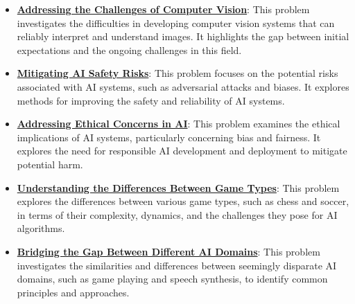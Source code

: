 \documentclass{article}%
\begin{document}
\begin{itemize}[leftmargin=*]
\item \href{https://purdue.brightspace.com/d2l/common/assets/pdfjs-d2l-dist/1.0.14-legacy/web/viewer.html?file=%2Fcontent%2Fenforced%2F1095467-wl.202510.CS.24300.001%2F02L2-Intro.pdf%3Fou%3D1095467&lang=en-us&container=d2l-fileviewer-rendered-pdf&fullscreen=d2l-fileviewer-rendered-pdf-dialog&height=667#page=15}{\textbf{Addressing the Challenges of Computer Vision}}: This problem investigates the difficulties in developing computer vision systems that can reliably interpret and understand images. It highlights the gap between initial expectations and the ongoing challenges in this field.%
\item \href{https://purdue.brightspace.com/d2l/common/assets/pdfjs-d2l-dist/1.0.14-legacy/web/viewer.html?file=%2Fcontent%2Fenforced%2F1095467-wl.202510.CS.24300.001%2F02L2-Intro.pdf%3Fou%3D1095467&lang=en-us&container=d2l-fileviewer-rendered-pdf&fullscreen=d2l-fileviewer-rendered-pdf-dialog&height=667#page=19}{\textbf{Mitigating AI Safety Risks}}: This problem focuses on the potential risks associated with AI systems, such as adversarial attacks and biases. It explores methods for improving the safety and reliability of AI systems.%
\item \href{https://purdue.brightspace.com/d2l/common/assets/pdfjs-d2l-dist/1.0.14-legacy/web/viewer.html?file=%2Fcontent%2Fenforced%2F1095467-wl.202510.CS.24300.001%2F02L2-Intro.pdf%3Fou%3D1095467&lang=en-us&container=d2l-fileviewer-rendered-pdf&fullscreen=d2l-fileviewer-rendered-pdf-dialog&height=667#page=20}{\textbf{Addressing Ethical Concerns in AI}}: This problem examines the ethical implications of AI systems, particularly concerning bias and fairness. It explores the need for responsible AI development and deployment to mitigate potential harm.%
\item \href{https://purdue.brightspace.com/d2l/common/assets/pdfjs-d2l-dist/1.0.14-legacy/web/viewer.html?file=%2Fcontent%2Fenforced%2F1095467-wl.202510.CS.24300.001%2F02L2-Intro.pdf%3Fou%3D1095467&lang=en-us&container=d2l-fileviewer-rendered-pdf&fullscreen=d2l-fileviewer-rendered-pdf-dialog&height=667#page=27}{\textbf{Understanding the Differences Between Game Types}}: This problem explores the differences between various game types, such as chess and soccer, in terms of their complexity, dynamics, and the challenges they pose for AI algorithms.%
\item \href{https://purdue.brightspace.com/d2l/common/assets/pdfjs-d2l-dist/1.0.14-legacy/web/viewer.html?file=%2Fcontent%2Fenforced%2F1095467-wl.202510.CS.24300.001%2F02L2-Intro.pdf%3Fou%3D1095467&lang=en-us&container=d2l-fileviewer-rendered-pdf&fullscreen=d2l-fileviewer-rendered-pdf-dialog&height=667#page=31}{\textbf{Bridging the Gap Between Different AI Domains}}: This problem investigates the similarities and differences between seemingly disparate AI domains, such as game playing and speech synthesis, to identify common principles and approaches.%

\end{itemize}
\end{document}
